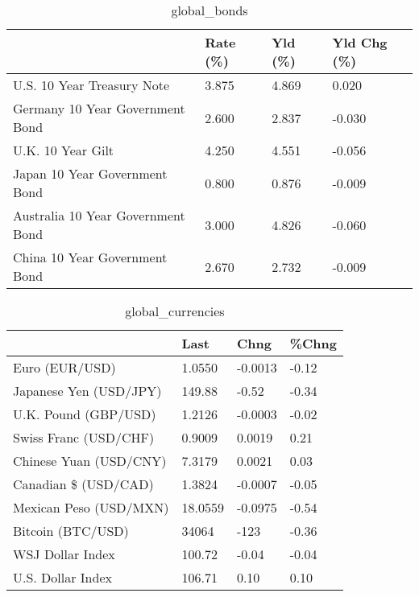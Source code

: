 \documentclass{article}%
\begin{document}
%


\begin{table}[htbp]%
\caption{global\_bonds}%
\centering%
\begin{adjustbox}{width=1\textwidth}%
\begin{tabular}{llll}
\toprule
                                  & Rate (\%) & Yld (\%) & Yld Chg (\%) \\
\midrule
       U.S. 10 Year Treasury Note &    3.875 &   4.869 &       0.020 \\
  Germany 10 Year Government Bond &    2.600 &   2.837 &      -0.030 \\
                U.K. 10 Year Gilt &    4.250 &   4.551 &      -0.056 \\
    Japan 10 Year Government Bond &    0.800 &   0.876 &      -0.009 \\
Australia 10 Year Government Bond &    3.000 &   4.826 &      -0.060 \\
    China 10 Year Government Bond &    2.670 &   2.732 &      -0.009 \\
\bottomrule
\end{tabular}
%
\end{adjustbox}%
\end{table}

%


\begin{table}[htbp]%
\caption{global\_currencies}%
\centering%
\begin{adjustbox}{width=1\textwidth}%
\begin{tabular}{llll}
\toprule
                       &    Last &    Chng & \%Chng \\
\midrule
        Euro (EUR/USD) &  1.0550 & -0.0013 & -0.12 \\
Japanese Yen (USD/JPY) &  149.88 &   -0.52 & -0.34 \\
  U.K. Pound (GBP/USD) &  1.2126 & -0.0003 & -0.02 \\
 Swiss Franc (USD/CHF) &  0.9009 &  0.0019 &  0.21 \\
Chinese Yuan (USD/CNY) &  7.3179 &  0.0021 &  0.03 \\
  Canadian \$ (USD/CAD) &  1.3824 & -0.0007 & -0.05 \\
Mexican Peso (USD/MXN) & 18.0559 & -0.0975 & -0.54 \\
     Bitcoin (BTC/USD) &   34064 &    -123 & -0.36 \\
      WSJ Dollar Index &  100.72 &   -0.04 & -0.04 \\
     U.S. Dollar Index &  106.71 &    0.10 &  0.10 \\
\bottomrule
\end{tabular}
%
\end{adjustbox}%
\end{table}
\end{document}
